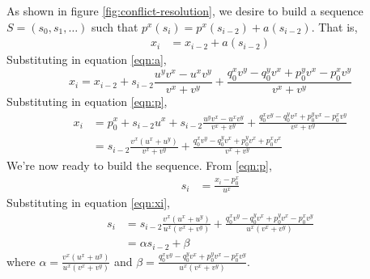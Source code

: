 \documentclass{egpubl}
\begin{document}


As shown in figure \ref{fig:conflict-resolution}, we desire to build a sequence $S=(s_0, s_1, \dots)$ such that $p^x(s_i) = p^x(s_{i-2}) + a(s_{i-2})$. %
That is,
\begin{align}
x_i &= x_{i-2} + a(s_{i-2}) \label{eqn:xi_init}
\end{align}
Substituting in equation \eqref{eqn:a},
\begin{equation}
x_i = x_{i-2} + s_{i-2}\frac{u^yv^x-u^xv^y}{v^x+v^y} + \frac{q_0^xv^y-q_0^yv^x+p_0^yv^x-p_0^xv^y}{v^x+v^y}
\end{equation}
Substituting in equation \eqref{eqn:p},
\begin{align}
x_i &= p_0^x+s_{i-2}u^x + s_{i-2}\frac{u^yv^x-u^xv^y}{v^x+v^y} + \frac{q_0^xv^y-q_0^yv^x+p_0^yv^x-p_0^xv^y}{v^x+v^y} \\
    &= s_{i-2}\frac{v^x(u^x+u^y)}{v^x+v^y} + \frac{q_0^xv^y-q_0^yv^x+p_0^yv^x+p_0^xv^x}{v^x+v^y} \label{eqn:xi}
\end{align}
We're now ready to build the sequence. From \eqref{eqn:p},
\begin{align}
s_i &= \frac{x_i-p_0^x}{u^x}
\end{align}
Substituting in equation \eqref{eqn:xi},
\begin{align}
s_i &= s_{i-2}\frac{v^x(u^x+u^y)}{u^x(v^x+v^y)} + \frac{q_0^xv^y-q_0^yv^x+p_0^yv^x-p_0^xv^y}{u^x(v^x+v^y)} \\
    &= \alpha s_{i-2} + \beta \label{eqn:si_rec}
\end{align}
where $\displaystyle \alpha=\frac{v^x(u^x+u^y)}{u^x(v^x+v^y)}$ and $\displaystyle \beta=\frac{q_0^xv^y-q_0^yv^x+p_0^yv^x-p_0^xv^y}{u^x(v^x+v^y)}$.
\end{document}
